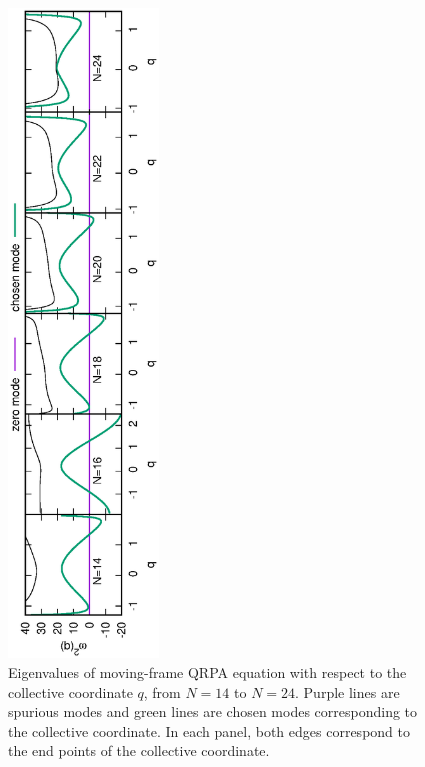 \documentclass[%
superscriptaddress,
showpacs,
nofootinbib,
amsmath,amssymb,
aps,
prc,
twocolumn,
floatfix ]%
{revtex4-1}
\begin{document}
\begin{figure}[t]
 \begin{center}
  \includegraphics[width=40mm,angle=-90]{omega_sq.eps}
 \end{center}
	\caption{Eigenvalues of moving-frame QRPA equation with respect to the collective coordinate $q$, from $N=14$ to $N=24$. Purple lines are spurious modes and green lines are chosen modes corresponding to the collective coordinate. In each panel, both edges correspond to the end points of the collective coordinate.
}
 \label{omega_sq}
\end{figure}
\end{document}
